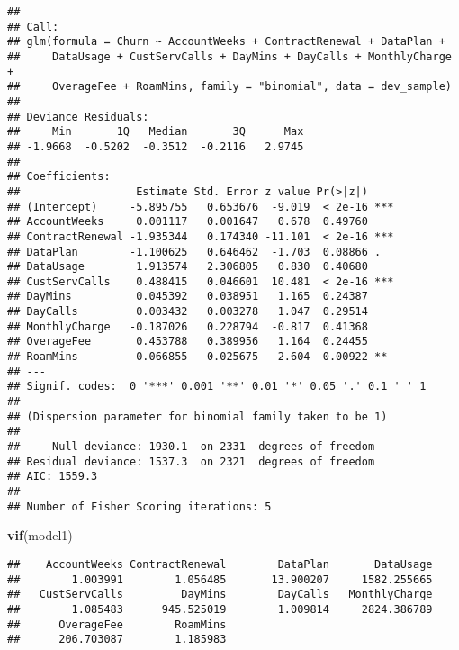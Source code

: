 \documentclass[]{article}
\newenvironment{Shaded}{\begin{snugshade}}{\end{snugshade}}
\newcommand{\KeywordTok}[1]{\textcolor[rgb]{0.13,0.29,0.53}{\textbf{#1}}}
\newcommand{\NormalTok}[1]{#1}
\begin{document}
\begin{verbatim}
## 
## Call:
## glm(formula = Churn ~ AccountWeeks + ContractRenewal + DataPlan + 
##     DataUsage + CustServCalls + DayMins + DayCalls + MonthlyCharge + 
##     OverageFee + RoamMins, family = "binomial", data = dev_sample)
## 
## Deviance Residuals: 
##     Min       1Q   Median       3Q      Max  
## -1.9668  -0.5202  -0.3512  -0.2116   2.9745  
## 
## Coefficients:
##                  Estimate Std. Error z value Pr(>|z|)    
## (Intercept)     -5.895755   0.653676  -9.019  < 2e-16 ***
## AccountWeeks     0.001117   0.001647   0.678  0.49760    
## ContractRenewal -1.935344   0.174340 -11.101  < 2e-16 ***
## DataPlan        -1.100625   0.646462  -1.703  0.08866 .  
## DataUsage        1.913574   2.306805   0.830  0.40680    
## CustServCalls    0.488415   0.046601  10.481  < 2e-16 ***
## DayMins          0.045392   0.038951   1.165  0.24387    
## DayCalls         0.003432   0.003278   1.047  0.29514    
## MonthlyCharge   -0.187026   0.228794  -0.817  0.41368    
## OverageFee       0.453788   0.389956   1.164  0.24455    
## RoamMins         0.066855   0.025675   2.604  0.00922 ** 
## ---
## Signif. codes:  0 '***' 0.001 '**' 0.01 '*' 0.05 '.' 0.1 ' ' 1
## 
## (Dispersion parameter for binomial family taken to be 1)
## 
##     Null deviance: 1930.1  on 2331  degrees of freedom
## Residual deviance: 1537.3  on 2321  degrees of freedom
## AIC: 1559.3
## 
## Number of Fisher Scoring iterations: 5
\end{verbatim}

\begin{Shaded}
\begin{Highlighting}[]
  \KeywordTok{vif}\NormalTok{(model1)}
\end{Highlighting}
\end{Shaded}

\begin{verbatim}
##    AccountWeeks ContractRenewal        DataPlan       DataUsage 
##        1.003991        1.056485       13.900207     1582.255665 
##   CustServCalls         DayMins        DayCalls   MonthlyCharge 
##        1.085483      945.525019        1.009814     2824.386789 
##      OverageFee        RoamMins 
##      206.703087        1.185983
\end{verbatim}
\end{document}
